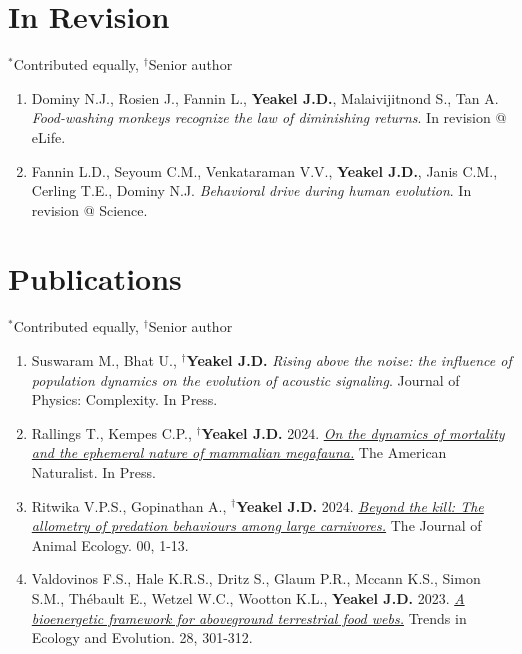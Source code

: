 \documentclass[margin,line,12pt]{res}
\newcommand\reverselabel[1]{%
  \def\theenumi{}%
  \renewcommand\makelabel{\makebox[\dimexpr\labelwidth-3pt\relax][r]{%
    \the\numexpr#1-\value{enumi}+1\relax}}}%
\begin{document}
\begin{resume}

\section{\sc In Revision}
{\footnotesize{${}^\ast$Contributed equally, ${}^\dag$Senior author}}
\begin{enumerate}
  \reverselabel{43}
\item Dominy N.J., Rosien J., Fannin L., \textbf{Yeakel J.D.}, Malaivijitnond S., Tan A. \emph{Food-washing monkeys recognize the law of diminishing returns}. In revision @ eLife.
\item Fannin L.D., Seyoum C.M., Venkataraman V.V., \textbf{Yeakel J.D.}, Janis C.M., Cerling T.E., Dominy N.J. \emph{Behavioral drive during human evolution}. In revision @ Science.
\end{enumerate}

\section{\sc Publications}
{\footnotesize{${}^\ast$Contributed equally, ${}^\dag$Senior author}}
\begin{enumerate}
  \reverselabel{41}

\item Suswaram M., Bhat U., \textbf{${}^\dag$Yeakel J.D.} \emph{Rising above the noise: the influence of population dynamics on the evolution of acoustic signaling}. Journal of Physics: Complexity. In Press.

\item Rallings T., Kempes C.P., \textbf{${}^\dag$Yeakel J.D.} 2024. \href{https://www.journals.uchicago.edu/doi/abs/10.1086/731331}{\emph{On the dynamics of mortality and the ephemeral nature of mammalian megafauna.}} The American Naturalist. In Press.

\item Ritwika V.P.S., Gopinathan A., \textbf{${}^\dag$Yeakel J.D.} 2024. \href{https://besjournals.onlinelibrary.wiley.com/doi/10.1111/1365-2656.14070}{\emph{Beyond the kill: The allometry of predation behaviours among large carnivores.}} The Journal of Animal Ecology. 00, 1-13.

\item Valdovinos F.S., Hale K.R.S., Dritz S., Glaum P.R., Mccann K.S., Simon S.M., Thébault E., Wetzel W.C., Wootton K.L.,  \textbf{Yeakel J.D.} 2023. \href{https://www.sciencedirect.com/science/article/pii/S0169534722002841}{\emph{A bioenergetic framework for aboveground terrestrial food webs.}} Trends in Ecology and Evolution. 28, 301-312.


\end{enumerate}
\end{resume}
\end{document}
